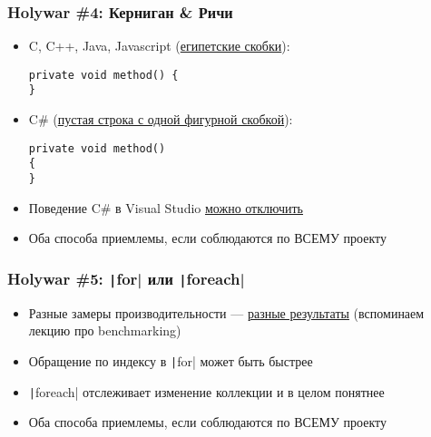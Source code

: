 \documentclass[xetex,mathserif,serif]{beamer}
\begin{document}
	\begin{frame}[fragile]
		\frametitle{Holywar \#4: Керниган \& Ричи}
		\begin{itemize}
			\item C, C++, Java, Javascript (\href{https://blog.codinghorror.com/new-programming-jargon/}{египетские скобки}):
				\begin{verbatim}
private void method() {
}
				\end{verbatim}
			\item C\# (\href{https://softwareengineering.stackexchange.com/questions/236995/why-do-c-developers-newline-opening-brackets}{пустая строка с одной фигурной скобкой}):
				\begin{verbatim}
private void method() 
{
}
				\end{verbatim}
			\item Поведение C\# в Visual Studio \href{https://stackoverflow.com/questions/4860933/how-to-make-visual-studio-not-put-on-a-new-line}{можно отключить}
			\item Оба способа приемлемы, если соблюдаются по ВСЕМУ проекту
		\end{itemize}
	\end{frame}

	\begin{frame}
		\frametitle{Holywar \#5: \texttt|for| или \texttt|foreach|}
		\begin{itemize}
			\item Разные замеры производительности --- \href{https://stackoverflow.com/questions/365615/in-net-which-loop-runs-faster-for-or-foreach}{разные результаты} (вспоминаем лекцию про benchmarking)
			\item Обращение по индексу в \texttt|for| может быть быстрее
			\item \texttt|foreach| отслеживает изменение коллекции и в целом понятнее
			\item Оба способа приемлемы, если соблюдаются по ВСЕМУ проекту
		\end{itemize}
	\end{frame}
\end{document}
